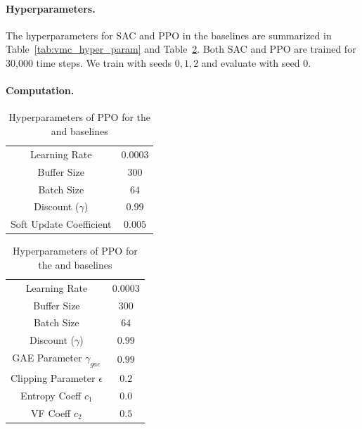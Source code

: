 \paragraph{Hyperparameters.} %
The hyperparameters for SAC and PPO in the baselines are summarized in Table~\ref{tab:vmc_hyper_param} and Table~\ref{tab:ppo_hyper_param}. Both SAC and PPO are trained for 30,000 time steps. We train with seeds $0, 1, 2$ and evaluate with seed $0$.

\paragraph{Computation.}

\begin{table}[t]
\centering
\begin{minipage}[t]{.41\linewidth}%
    \begin{tabular}{c|c}
    \toprule
        Learning Rate & $0.0003$ \\
        Buffer Size & $300$ \\
        Batch Size &  $64$ \\
        Discount ($\gamma$) & $0.99$ \\
        Soft Update Coefficient & $0.005$ \\
    \bottomrule
    \end{tabular}
    \caption{Hyperparameters of SAC for the \rlvmc baseline}
    \label{tab:vmc_hyper_param}
\end{minipage}
\hfill
\begin{minipage}[t]{.41\linewidth}%
    \begin{tabular}{c|c}
    \toprule
        Learning Rate & $0.0003$ \\
        Buffer Size & $300$ \\
        Batch Size &  $64$ \\
        Discount ($\gamma$) & $0.99$ \\
        GAE Parameter $\gamma_{gae}$ & $0.99$ \\
        Clipping Parameter $\epsilon$ & $0.2$ \\
        Entropy Coeff $c_1$ & $0.0$ \\
        VF Coeff $c_2$ & $0.5$ \\
    \bottomrule
    \end{tabular}
    \caption{Hyperparameters of PPO for the \rlprim and \rlprimhist baselines}
    \label{tab:ppo_hyper_param}
\end{minipage}
\end{table}

